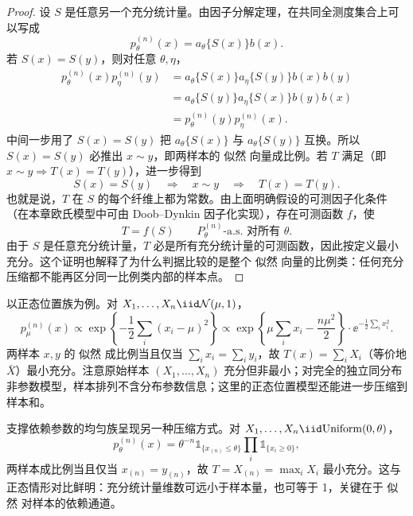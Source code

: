 \begin{proof}
设 $S$ 是任意另一个充分统计量。由因子分解定理，在共同全测度集合上可以写成
\[
 p_\theta^{(n)}(x)
 =a_\theta\{S(x)\}b(x).
\]
若 $S(x)=S(y)$，则对任意 $\theta,\eta$，
\begin{align*}
 p_\theta^{(n)}(x)p_\eta^{(n)}(y)
 &=a_\theta\{S(x)\}a_\eta\{S(y)\}b(x)b(y)\\
 &=a_\theta\{S(y)\}a_\eta\{S(x)\}b(y)b(x)\\
 &=p_\theta^{(n)}(y)p_\eta^{(n)}(x).
\end{align*}
中间一步用了 $S(x)=S(y)$ 把 $a_\theta\{S(x)\}$ 与 $a_\theta\{S(y)\}$ 互换。所以 $S(x)=S(y)$ 必推出 $x\sim y$，即两样本的 似然 向量成比例。若 $T$ 满足（即 $x\sim y\Rightarrow T(x)=T(y)$），进一步得到
\[
 S(x)=S(y)
 \quad\Longrightarrow\quad
 x\sim y
 \quad\Longrightarrow\quad
 T(x)=T(y).
\]
也就是说，$T$ 在 $S$ 的每个纤维上都为常数。由上面明确假设的可测因子化条件（在本章欧氏模型中可由 Doob--Dynkin 因子化实现），存在可测函数 $f$，使
\[
 T=f(S)
 \qquad P_\theta^{(n)}\text{-a.s. 对所有 }\theta.
\]
由于 $S$ 是任意充分统计量，$T$ 必是所有充分统计量的可测函数，因此按定义最小充分。这个证明也解释了为什么判据比较的是整个 似然 向量的比例类：任何充分压缩都不能再区分同一比例类内部的样本点。
\end{proof}

\begin{workedexample}[正态位置的最小充分统计量]
以正态位置族为例。对 $X_1,\ldots,X_n\iid\mathcal N(\mu,1)$，
\[
p_\mu^{(n)}(x)\propto\exp\!\left\{-\frac12\sum_i(x_i-\mu)^2\right\}
\propto\exp\!\left\{\mu\sum_i x_i-\frac{n\mu^2}{2}\right\}\cdot\ee^{-\frac12\sum_i x_i^2}.
\]
两样本 $x,y$ 的 似然 成比例当且仅当 $\sum_i x_i=\sum_i y_i$，故 $T(x)=\sum_i X_i$（等价地 $\bar X$）最小充分。注意原始样本 $(X_1,\ldots,X_n)$ 充分但非最小；对完全的独立同分布非参数模型，样本排列不含分布参数信息；这里的正态位置模型还能进一步压缩到样本和。
\end{workedexample}

\begin{workedexample}[均匀端点的最小充分统计量]
支撑依赖参数的均匀族呈现另一种压缩方式。对 $X_1,\ldots,X_n\iid\mathrm{Uniform}(0,\theta)$，
\[
p_\theta^{(n)}(x)=\theta^{-n}\mathds{1}_{\{x_{(n)}\le\theta\}}\prod_i\mathds{1}_{\{x_i\ge0\}},
\]
两样本成比例当且仅当 $x_{(n)}=y_{(n)}$，故 $T=X_{(n)}=\max_i X_i$ 最小充分。这与正态情形对比鲜明：充分统计量维数可远小于样本量，也可等于 1，关键在于 似然 对样本的依赖通道。
\end{workedexample}

